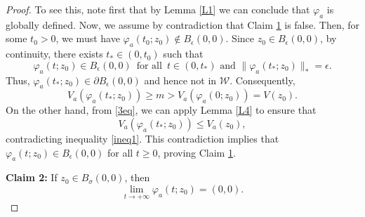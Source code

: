 \documentclass[12pt]{amsart}
\numberwithin{equation}{section}
\begin{document}
\begin{proof}
To see this, note first that by Lemma \ref{L1} we can conclude that $\varphi_a$ is globally defined. Now, we assume by contradiction that Claim \hyperlink{C1}{1} is false. Then, for some $t_{0} > 0$, we must have $\varphi_a(t_{0};z_0) \notin B_\epsilon(0,0)$. Since $z_0 \in B_\epsilon(0,0)$, by continuity, there exists $t_* \in (0, t_{0})$ such that
\begin{equation}\label{3eq}
	\varphi_a(t;z_0) \in B_\epsilon(0,0)\,\text{ for all } \, t \in (0, t_*)\text{ and }\|\varphi_a(t_*;z_0)\|_* = \epsilon.
\end{equation}
Thus, $\varphi_a(t_*;z_0) \in \partial B_\epsilon(0,0)$ and hence not in $\mathcal{W}$. Consequently,
\begin{equation}\label{ineq1}
	V_a(\varphi_a(t_*;z_0)) \geq m > V_a(\varphi_a(0;z_0))=V(z_0).
\end{equation}
On the other hand, from \eqref{3eq}, we can apply Lemma \ref{L4} to ensure that
$$
V_a(\varphi_a(t_*;z_0)) \leq V_a(z_0),
$$
contradicting inequality \eqref{ineq1}. This contradiction implies that $\varphi_a(t;z_0) \in B_\epsilon(0,0)$ for all $t \geq 0$, proving Claim \hyperlink{C1}{1}.
	
\noindent\textbf{\hypertarget{C2}{Claim 2:}} If $z_0 \in B_ \sigma(0,0)$, then
$$
\lim_{t \to +\infty} \varphi_a(t;z_0) = (0,0).
$$
	

\end{proof}
\end{document}
